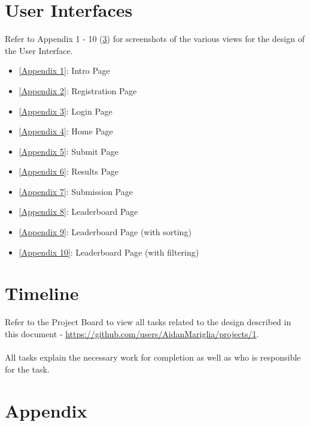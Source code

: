 \documentclass[12pt, titlepage]{article}
\begin{document}

\section{User Interfaces} \label{UI}

Refer to Appendix 1 - 10 (\ref{Appendix}) for screenshots of the various views for the design of the User Interface.

\begin{itemize}
    \item \ref{Appendix 1}: Intro Page
    \item \ref{Appendix 2}: Registration Page
    \item \ref{Appendix 3}: Login Page
    \item \ref{Appendix 4}: Home Page
    \item \ref{Appendix 5}: Submit Page
    \item \ref{Appendix 6}: Results Page
    \item \ref{Appendix 7}: Submission Page
    \item \ref{Appendix 8}: Leaderboard Page
    \item \ref{Appendix 9}: Leaderboard Page (with sorting)
    \item \ref{Appendix 10}: Leaderboard Page (with filtering)
\end{itemize}

\section{Timeline} \label{Timeline}

Refer to the Project Board to view all tasks related to the design described in this document - \url{https://github.com/users/AidanMariglia/projects/1}.\\ \\ All tasks explain the necessary work for completion as well as who is responsible for the task.

\section{Appendix}\label{Appendix}
\end{document}
